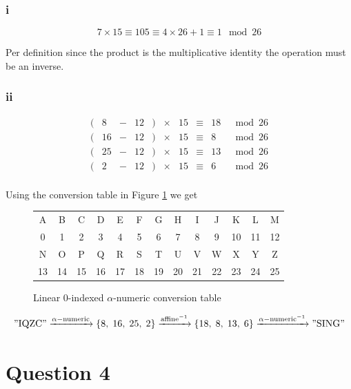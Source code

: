 \documentclass{article}
\begin{document}
\subsubsection{i}

$$7 \times 15 \equiv 105 \equiv 4 \times 26 + 1 \equiv 1 \mod 26$$

Per definition since the product is the multiplicative identity the operation must be an inverse.

\subsubsection{ii}

$$\begin{matrix}
		( & 8  & - & 12 & ) & \times & 15 & \equiv & 18 & \mod 26 \\
		( & 16 & - & 12 & ) & \times & 15 & \equiv & 8  & \mod 26 \\
		( & 25 & - & 12 & ) & \times & 15 & \equiv & 13 & \mod 26 \\
		( & 2  & - & 12 & ) & \times & 15 & \equiv & 6  & \mod 26 \\
	\end{matrix}$$

Using the conversion table in Figure \ref{fig:conversion-table} we get

\begin{figure}[H]
	\centering
	\begin{tabular}{|c|c|c|c|c|c|c|c|c|c|c|c|c|}
		\hline
		A  & B  & C  & D  & E  & F  & G  & H  & I  & J  & K  & L  & M  \\
		0  & 1  & 2  & 3  & 4  & 5  & 6  & 7  & 8  & 9  & 10 & 11 & 12 \\
		\hline
		N  & O  & P  & Q  & R  & S  & T  & U  & V  & W  & X  & Y  & Z  \\
		13 & 14 & 15 & 16 & 17 & 18 & 19 & 20 & 21 & 22 & 23 & 24 & 25 \\
		\hline
	\end{tabular}
	\caption{Linear $0$-indexed $\alpha$-numeric conversion table}
	\label{fig:conversion-table}
\end{figure}

$$"\mathrm{IQZC}"\xrightarrow{\alpha-\mathrm{numeric}}\{8,\;16,\;25,\;2\}\xrightarrow{\mathrm{affine}^{-1}}\{18,\;8,\;13,\;6\}\xrightarrow{{\alpha-\mathrm{numeric}}^{-1}}"\mathrm{SING}"$$

\section{Question 4}
\end{document}
